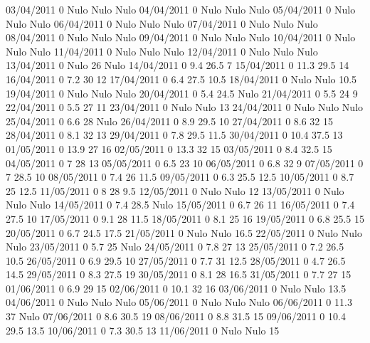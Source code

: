 03/04/2011  0     Nulo   Nulo   Nulo
04/04/2011  0     Nulo   Nulo   Nulo
05/04/2011  0     Nulo   Nulo   Nulo
06/04/2011  0     Nulo   Nulo   Nulo
07/04/2011  0     Nulo   Nulo   Nulo
08/04/2011  0     Nulo   Nulo   Nulo
09/04/2011  0     Nulo   Nulo   Nulo
10/04/2011  0     Nulo   Nulo   Nulo
11/04/2011  0     Nulo   Nulo   Nulo
12/04/2011  0     Nulo   Nulo   Nulo
13/04/2011  0     Nulo    26    Nulo
14/04/2011  0      9.4    26.5   7 
15/04/2011  0      11.3   29.5   14 
16/04/2011  0      7.2    30     12 
17/04/2011  0      6.4    27.5   10.5 
18/04/2011  0     Nulo   Nulo    10.5 
19/04/2011  0     Nulo   Nulo   Nulo
20/04/2011  0      5.4    24.5  Nulo
21/04/2011  0      5.5    24     9 
22/04/2011  0      5.5    27     11 
23/04/2011  0     Nulo   Nulo    13 
24/04/2011  0     Nulo   Nulo   Nulo
25/04/2011  0      6.6    28    Nulo
26/04/2011  0      8.9    29.5   10 
27/04/2011  0      8.6    32     15 
28/04/2011  0      8.1    32     13 
29/04/2011  0      7.8    29.5   11.5 
30/04/2011  0      10.4   37.5   13 
01/05/2011  0      13.9   27     16 
02/05/2011  0      13.3   32     15 
03/05/2011  0      8.4    32.5   15 
04/05/2011  0      7      28     13 
05/05/2011  0      6.5    23     10 
06/05/2011  0      6.8    32     9 
07/05/2011  0      7      28.5   10 
08/05/2011  0      7.4    26     11.5 
09/05/2011  0      6.3    25.5   12.5 
10/05/2011  0      8.7    25     12.5 
11/05/2011  0      8      28     9.5 
12/05/2011  0     Nulo   Nulo    12 
13/05/2011  0     Nulo   Nulo   Nulo
14/05/2011  0      7.4    28.5  Nulo
15/05/2011  0      6.7    26     11 
16/05/2011  0      7.4    27.5   10 
17/05/2011  0      9.1    28     11.5 
18/05/2011  0      8.1    25     16 
19/05/2011  0      6.8    25.5   15 
20/05/2011  0      6.7    24.5   17.5 
21/05/2011  0     Nulo   Nulo    16.5 
22/05/2011  0     Nulo   Nulo   Nulo
23/05/2011  0      5.7    25    Nulo
24/05/2011  0      7.8    27     13 
25/05/2011  0      7.2    26.5   10.5 
26/05/2011  0      6.9    29.5   10 
27/05/2011  0      7.7    31     12.5 
28/05/2011  0      4.7    26.5   14.5 
29/05/2011  0      8.3    27.5   19 
30/05/2011  0      8.1    28     16.5 
31/05/2011  0      7.7    27     15 
01/06/2011  0      6.9    29     15 
02/06/2011  0      10.1   32     16 
03/06/2011  0     Nulo   Nulo    13.5 
04/06/2011  0     Nulo   Nulo   Nulo
05/06/2011  0     Nulo   Nulo   Nulo
06/06/2011  0      11.3   37    Nulo
07/06/2011  0      8.6    30.5   19 
08/06/2011  0      8.8    31.5   15 
09/06/2011  0      10.4   29.5   13.5 
10/06/2011  0      7.3    30.5   13 
11/06/2011  0     Nulo   Nulo    15 
